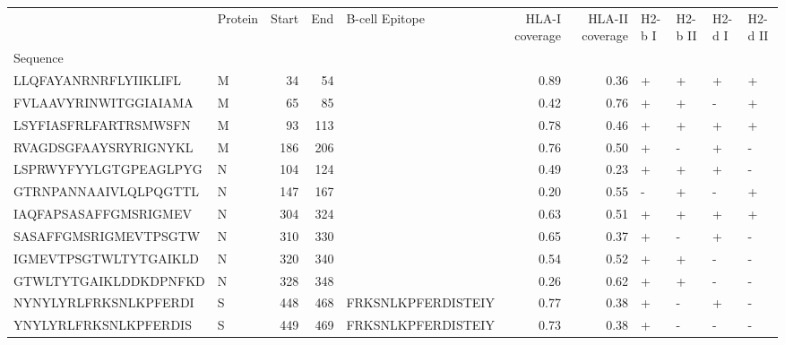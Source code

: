 \begin{tabular}{llrrlrrllll}
\toprule
{} & Protein &  Start &   End &      B-cell Epitope &  HLA-I coverage &  HLA-II coverage & H2-b I & H2-b II & H2-d I & H2-d II \\
Sequence              &         &        &       &                     &                 &                  &        &         &        &         \\
\midrule
LLQFAYANRNRFLYIIKLIFL &       M &     34 &    54 &                     &            0.89 &             0.36 &      + &       + &      + &       + \\
FVLAAVYRINWITGGIAIAMA &       M &     65 &    85 &                     &            0.42 &             0.76 &      + &       + &      - &       + \\
LSYFIASFRLFARTRSMWSFN &       M &     93 &   113 &                     &            0.78 &             0.46 &      + &       + &      + &       + \\
RVAGDSGFAAYSRYRIGNYKL &       M &    186 &   206 &                     &            0.76 &             0.50 &      + &       - &      + &       - \\
LSPRWYFYYLGTGPEAGLPYG &       N &    104 &   124 &                     &            0.49 &             0.23 &      + &       + &      + &       - \\
GTRNPANNAAIVLQLPQGTTL &       N &    147 &   167 &                     &            0.20 &             0.55 &      - &       + &      - &       + \\
IAQFAPSASAFFGMSRIGMEV &       N &    304 &   324 &                     &            0.63 &             0.51 &      + &       + &      + &       + \\
SASAFFGMSRIGMEVTPSGTW &       N &    310 &   330 &                     &            0.65 &             0.37 &      + &       - &      + &       - \\
IGMEVTPSGTWLTYTGAIKLD &       N &    320 &   340 &                     &            0.54 &             0.52 &      + &       + &      - &       - \\
GTWLTYTGAIKLDDKDPNFKD &       N &    328 &   348 &                     &            0.26 &             0.62 &      + &       + &      - &       - \\
NYNYLYRLFRKSNLKPFERDI &       S &    448 &   468 &  FRKSNLKPFERDISTEIY &            0.77 &             0.38 &      + &       - &      + &       - \\
YNYLYRLFRKSNLKPFERDIS &       S &    449 &   469 &  FRKSNLKPFERDISTEIY &            0.73 &             0.38 &      + &       - &      - &       - \\

\end{tabular}
